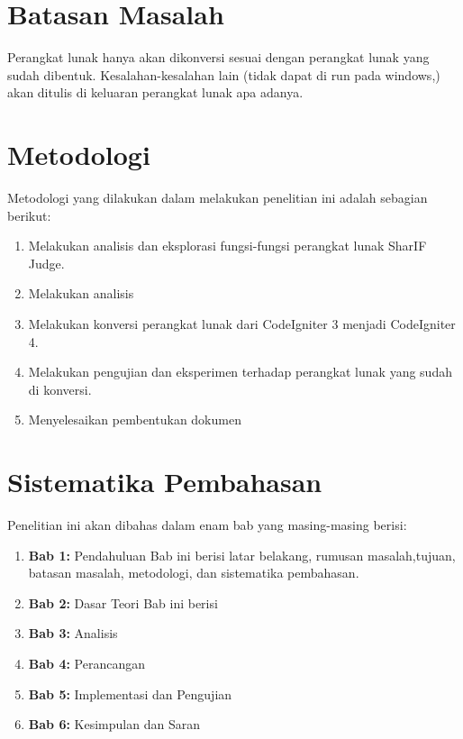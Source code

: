 \section{Batasan Masalah}
\label{sec:batasan}
Perangkat lunak hanya akan dikonversi sesuai dengan perangkat lunak yang sudah dibentuk. Kesalahan-kesalahan lain (tidak dapat di run pada windows,) akan ditulis di keluaran perangkat lunak apa adanya.

\section{Metodologi}
\label{sec:metlit}
Metodologi yang dilakukan dalam melakukan penelitian ini adalah sebagian berikut:
\begin{enumerate}
	\item Melakukan analisis dan eksplorasi fungsi-fungsi perangkat lunak SharIF Judge.
	\item Melakukan analisis 
	\item Melakukan konversi perangkat lunak dari CodeIgniter 3 menjadi CodeIgniter 4.
	\item Melakukan pengujian dan eksperimen terhadap perangkat lunak yang sudah di konversi.
	\item Menyelesaikan pembentukan dokumen
\end{enumerate}

\section{Sistematika Pembahasan}
\label{sec:sispem}
Penelitian ini akan dibahas dalam enam bab yang masing-masing berisi:
\begin{enumerate}
	\item \textbf{Bab 1:} Pendahuluan
	Bab ini berisi latar belakang, rumusan masalah,tujuan, batasan masalah, metodologi, dan sistematika pembahasan.
	\item \textbf{Bab 2:} Dasar Teori
	Bab ini berisi 
	\item \textbf{Bab 3:} Analisis
	\item \textbf{Bab 4:} Perancangan
	\item \textbf{Bab 5:} Implementasi dan Pengujian
	\item \textbf{Bab 6:} Kesimpulan dan Saran
\end{enumerate}
